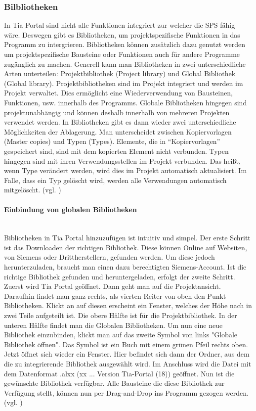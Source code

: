     \subsubsection{Bilbliotheken } \mbox{}
    In Tia Portal sind nicht alle Funktionen integriert zur welcher die SPS fähig wäre. Deswegen gibt es Bibliotheken, um projektspezifische Funktionen in das Programm zu intergrieren. Bibliotheken können zusätzlich dazu genutzt werden um projektspezifische Bausteine oder Funktionen auch für andere Programme zugänglich zu machen. Generell kann man Bibliotheken in zwei unterschiedliche Arten unterteilen: Projektbibliothek (Project library) und Global Bibliothek (Global library). Projektbibliotheken sind im Projekt integriert und werden im Projekt verwaltet. Dies ermöglicht eine Wiederverwendung von Bausteinen, Funktionen, usw. innerhalb des Programms. Globale Bibliotheken hingegen sind projektunabhängig und können deshalb innerhalb von mehreren Projekten verwendet werden. In Bibliotheken gibt es dann wieder zwei unterschiedliche Möglichkeiten der Ablagerung. Man unterscheidet zwischen Kopiervorlagen (Master copies) und Typen (Types). Elemente, die in \enquote{Kopiervorlagen} gespeichert sind, sind mit dem kopierten Element nicht verbunden. Typen hingegen sind mit ihren Verwendungsstellen im Projekt verbunden. Das heißt, wenn Type verändert werden, wird dies im Projekt automatisch aktualisiert. Im Falle, dass ein Typ gelöscht wird, werden alle Verwendungen automatisch mitgelöscht.  
    (vgl. \cite{Programmierleitfaden_für_S7-1500})


        \paragraph{Einbindung von globalen Bibliotheken} \mbox{} \\
        \label{Bilbliotheken}
        Bibliotheken in Tia Portal hinzuzufügen ist intuitiv und simpel. Der erste Schritt ist das Downloaden der richtigen Bibliothek. Diese können Online auf Websiten, von Siemens oder Drittherstellern, gefunden werden. Um diese jedoch herunterzuladen, braucht man einen dazu berechtigten Siemens-Account. Ist die richtige Bibliothek gefunden und heruntergeladen, erfolgt der zweite Schritt. Zuerst wird Tia Portal geöffnet. Dann geht man auf die Projektansicht. Daraufhin findet man ganz rechts, als vierten Reiter von oben den Punkt Bibliotheken. Klickt an auf diesen erscheint ein Fenster, welches der Höhe nach in zwei Teile aufgeteilt ist. Die obere Hälfte ist für die Projektbibliothek. In der unteren Hälfte findet man die Globalen Bibliotheken. Um nun eine neue Bibliothek einzubinden, klickt man auf das zweite Symbol von links "Globale Bibliothek öffnen". Das Symbol ist ein Buch mit einem grünen Pfeil rechts oben. Jetzt öffnet sich wieder ein Fenster. Hier befindet sich  dann der Ordner, aus dem die zu integrierende Bibliothek ausgewählt wird. Im Anschluss wird die Datei mit dem Datenformat .alxx (xx ... Version Tia-Portal (18)) geöffnet. Nun ist die gewünschte Bibliothek verfügbar. Alle Bausteine die diese Bibliothek zur Verfügung stellt, können nun per Drag-and-Drop ins Programm gezogen werden.
        (vgl. \cite{Bibliotheken})


